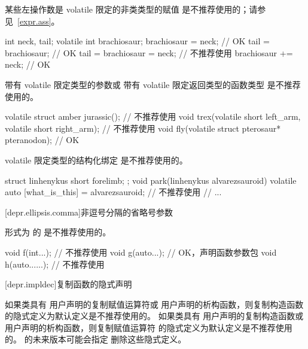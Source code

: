 \pnum
某些左操作数是 volatile 限定的非类类型的赋值
是不推荐使用的；请参见~\ref{expr.ass}。

\begin{example}
\begin{codeblock}
int neck, tail;
volatile int brachiosaur;
brachiosaur = neck;                 // OK
tail = brachiosaur;                 // OK
tail = brachiosaur = neck;          // 不推荐使用
brachiosaur += neck;                // OK
\end{codeblock}
\end{example}


\pnum
带有 volatile 限定类型的参数或
带有 volatile 限定返回类型的函数类型
是不推荐使用的。

\begin{example}
\begin{codeblock}
volatile struct amber jurassic();                               // 不推荐使用
void trex(volatile short left_arm, volatile short right_arm);   // 不推荐使用
void fly(volatile struct pterosaur* pteranodon);                // OK
\end{codeblock}
\end{example}


\pnum
volatile 限定类型的结构化绑定
是不推荐使用的。

\begin{example}
\begin{codeblock}
struct linhenykus { short forelimb; };
void park(linhenykus alvarezsauroid) {
  volatile auto [what_is_this] = alvarezsauroid;                // 不推荐使用
  // ...
}
\end{codeblock}
\end{example}

[depr.ellipsis.comma]{非逗号分隔的省略号参数}

形式为
  的 
是不推荐使用的。
\begin{example}
\begin{codeblock}
void f(int...);         // 不推荐使用
void g(auto...);        // OK，声明函数参数包
void h(auto......);     // 不推荐使用
\end{codeblock}
\end{example}

[depr.impldec]{复制函数的隐式声明}

\pnum
如果类具有
用户声明的复制赋值运算符或
用户声明的析构函数，则复制构造函数
的隐式定义为默认定义是不推荐使用的。
如果类具有
用户声明的复制构造函数或
用户声明的析构函数，则复制赋值运算符
的隐式定义为默认定义是不推荐使用的。
\Cpp{} 的未来版本可能会指定
删除这些隐式定义。

